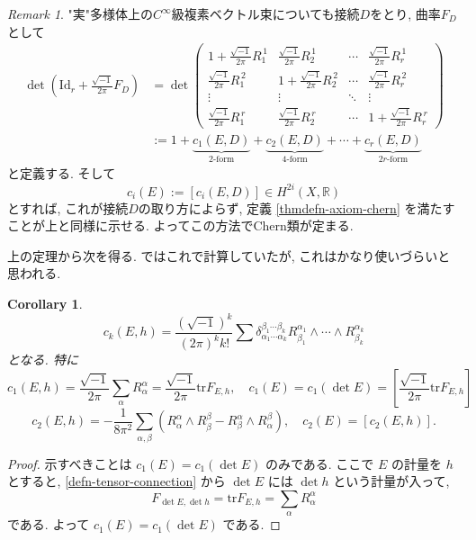 \documentclass[dvipdfmx,a4paper,11pt]{article} %
\newtheorem{cor}[thm]{Corollary}
\theoremstyle{definition}
\theoremstyle{remark}
\newtheorem{rem}[thm]{Remark}
\numberwithin{equation}{section}
\newcommand{\R}{\mathbb{R}}
\begin{document}
\begin{rem}
\label{rem-chern-class-rem}
"実"多様体上の$C^\infty$級複素ベクトル束についても接続$D$をとり, 曲率$F_D$として
\begin{align*}
\det\left(\mathrm{Id}_r+\frac{\sqrt{-1}}{2\pi }F_{D}\right)
&=\det
\begin{pmatrix}
1+\frac{\sqrt{-1}}{2\pi }R_1^{\,1} & \frac{\sqrt{-1}}{2\pi }R_2^{\,1}& \cdots &\frac{\sqrt{-1}}{2\pi } R_r^{\,1}\\
\frac{\sqrt{-1}}{2\pi }R_1^{\,2}&1+\frac{\sqrt{-1}}{2\pi }R_2^{\,2}& \cdots & \frac{\sqrt{-1}}{2\pi }R_r^{\,2}\\
\vdots & \vdots & \ddots & \vdots\\
\frac{\sqrt{-1}}{2\pi }R_1^{\,r}&\frac{\sqrt{-1}}{2\pi }R_2^{\,r}& \cdots &1+\frac{\sqrt{-1}}{2\pi }R_r^{\,r}
\end{pmatrix}
\\
&:=1+\underbrace{c_1(E, D)}_{\text{\(2\)-form}}+
\underbrace{c_2(E, D)}_{\text{\(4\)-form}}+\cdots+
\underbrace{c_r(E, D)}_{\text{\(2r\)-form}}
\end{align*}
と定義する. 
そして
$$
c_i(E):=[c_i(E, D)] \in H^{2i}(X, \R)
$$
とすれば, これが接続$D$の取り方によらず, 定義 \ref{thmdefn-axiom-chern} を満たすことが上と同様に示せる. 
よってこの方法でChern類が定まる. 
\end{rem}

上の定理から次を得る.  \cite[Ch.2]{Kob14} ではこれで計算していたが, これはかなり使いづらいと思われる.
\begin{cor}
\label{cor-chern-class-curv}
\[
c_k(E,h)
=
\frac{(\sqrt{-1})^k}{(2\pi)^k k!}
\sum
\delta^{\beta_1\cdots \beta_k}_{\alpha_1\cdots \alpha_k}
R^{\alpha_1}_{\beta_1}\wedge\cdots\wedge R^{\alpha_k}_{\beta_k}
\]
となる.
特に
\[
c_1(E,h)=\frac{\sqrt{-1}}{2\pi }
\sum_\alpha R^\alpha_\alpha
=\frac{\sqrt{-1}}{2\pi }\mathrm{tr}F_{E,h},
\quad
c_1(E)=c_1(\det E)=\left[ \frac{\sqrt{-1}}{2\pi }\mathrm{tr}F_{E,h} \right]
\]
\[
c_2(E,h)=
-\frac{1}{8\pi^2}\sum_{\alpha,\beta} \left(R^\alpha_\alpha\wedge R^\beta_\beta-R^\alpha_\beta\wedge R^\beta_\alpha\right),
\quad
c_2(E)=[c_2(E,h)].
\]
\end{cor}
\begin{proof}
示すべきことは \(c_1(E)=c_1(\det E)\) のみである. ここで \(E\) の計量を \(h\) とすると, \ref{defn-tensor-connection} から \(\det E\) には \(\det h\) という計量が入って,
\[
F_{\det E,\det h}=\mathrm{tr}F_{E,h}
=\sum_\alpha R^\alpha_\alpha 
\]
である. よって \(c_1(E)=c_1(\det E)\) である.
\end{proof}
\end{document}
